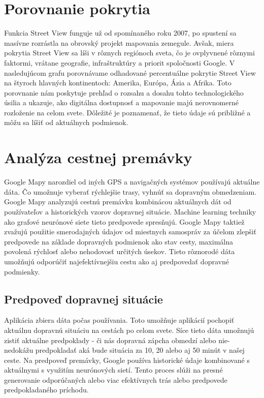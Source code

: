 \documentclass[10pt,slovak,a4paper]{article}
\begin{document}
\section{Porovnanie pokrytia}
Funkcia Street View funguje už od spomínaného roku 2007, po spustení sa masívne rozrástla na obrovský projekt mapovania zemegule.  Avšak, miera pokrytia Street View sa líši v rôznych regiónoch sveta, čo je ovplyvnené rôznymi faktormi, vrátane geografie, infraštruktúry a priorit spoločnosti Google. V nasledujúcom grafu porovnávame odhadované percentuálne pokrytie Street View na štyroch hlavných kontinentoch: Amerika, Európa, Ázia a Afrika. Toto porovnanie nám poskytuje prehľad o rozsahu a dosahu tohto technologického úsilia a ukazuje, ako digitálna dostupnosť a mapovanie majú nerovnomerné rozloženie na celom svete. Dôležité je poznamenať, že tieto údaje sú približné a môžu sa líšiť od aktuálnych podmienok.\cite{coverage}





\section{Analýza cestnej premávky} \label{Analyza}
Google Mapy narozdiel od iných GPS a navigačných systémov používajú aktuálne dáta. \cite{AI-and-traffic}Čo umožnuje vyberať rýchlejšie trasy, vyhnúť sa dopravným obmedzeniam. 
Google Mapy analyzujú cestnú premávku kombinácou aktuálnych dát od používateľov a historických vzorov dopravnej situácie. Machine learning techniky ako grafové neurónové siete tieto predpovede spresňujú. Google Mapy taktiež zvažujú použitie smerodajných údajov od miestnych samospráv za účelom zlepšiť predpovede na základe dopravných podmienok ako stav cesty, maximálna povolená rýchlosť alebo nehodovosť určitých úsekov. Tieto rôznorodé dáta umožňujú odporúčiť najefektívnejšiu cestu ako aj predpovedať dopravné podmienky.
\subsection{Predpoveď dopravnej situácie}
Aplikácia zbiera dáta počas používania. Toto umožňuje aplikácií pochopiť aktuálnu dopravnú situáciu na cestách po celom svete. Síce tieto dáta umožnujú zistiť aktuálne predpoklady - či nás dopravná zápcha obmedzí alebo nie- nedokážu predpokladať aká bude situácia za 10, 20 alebo aj 50 minút v našej ceste. Na predpoveď premávky, Google používa historické údaje kombinované s aktuálnymi s využitím neurónových sietí. Tento proces slúži na presné generovanie odporúčaných alebo viac efektívnych trás alebo predpovede predpokladaného príchodu.
\end{document}
